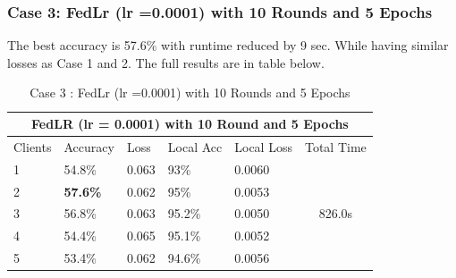 \documentclass[conference]{IEEEtran}
\newcommand{\RNum}[1]{\uppercase\expandafter{\romannumeral #1\relax}}
\begin{document}
 \subsubsection{Case 3: FedLr (lr =0.0001) with 10 Rounds and 5 Epochs}
The best accuracy is 57.6\% with runtime reduced by 9 sec. While having similar losses as Case 1 and 2. The full results are in table \RNum{3} below.
 \begin{table}[ht]
 	\centering
 	\caption{Case 3 : FedLr (lr =0.0001) with 10 Rounds and 5 Epochs}
 		\begin{tabular}{|lllllc|}
 			\hline
 			\multicolumn{6}{|c|}{FedLR (lr = 0.0001) with 10 Round and 5 Epochs}                                                                                                                            \\ \hline
 			\multicolumn{1}{|l|}{Clients} & \multicolumn{1}{l|}{Accuracy} & \multicolumn{1}{l|}{Loss}  & \multicolumn{1}{l|}{Local Acc} & \multicolumn{1}{l|}{Local Loss} & \multicolumn{1}{l|}{Total Time} \\ \hline
 			\multicolumn{1}{|l|}{1}       & \multicolumn{1}{l|}{54.8\%}   & \multicolumn{1}{l|}{0.063} & \multicolumn{1}{l|}{93\%}      & \multicolumn{1}{l|}{0.0060}     & \multirow{5}{*}{826.0s}         \\ \cline{1-5}
 			\multicolumn{1}{|l|}{2}       & \multicolumn{1}{l|}{\textbf{57.6\%}}   & \multicolumn{1}{l|}{0.062} & \multicolumn{1}{l|}{95\%}      & \multicolumn{1}{l|}{0.0053}     &                                 \\ \cline{1-5}
 			\multicolumn{1}{|l|}{3}       & \multicolumn{1}{l|}{56.8\%}   & \multicolumn{1}{l|}{0.063} & \multicolumn{1}{l|}{95.2\%}    & \multicolumn{1}{l|}{0.0050}     &                                 \\ \cline{1-5}
 			\multicolumn{1}{|l|}{4}       & \multicolumn{1}{l|}{54.4\%}   & \multicolumn{1}{l|}{0.065} & \multicolumn{1}{l|}{95.1\%}    & \multicolumn{1}{l|}{0.0052}     &                                 \\ \cline{1-5}
 			\multicolumn{1}{|l|}{5}       & \multicolumn{1}{l|}{53.4\%}   & \multicolumn{1}{l|}{0.062} & \multicolumn{1}{l|}{94.6\%}    & \multicolumn{1}{l|}{0.0056}     &                                 \\ \hline
 		\end{tabular}%
 \end{table}
\end{document}
